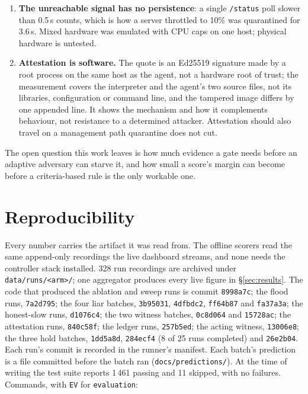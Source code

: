 \documentclass[10pt,twocolumn,letterpaper]{article}
\begin{document}
\begin{enumerate}[leftmargin=1.2em,itemsep=2pt,topsep=2pt]
  that the gate isolates quickly goes unblamed.
\item \textbf{The unreachable signal has no persistence}: a single
  \texttt{/status} poll slower than 0.5\,s counts, which is how a server
  throttled to 10\% was quarantined for 3.6\,s. Mixed hardware was emulated
  with CPU caps on one host; physical hardware is untested.
\item \textbf{Attestation is software.} The quote is an Ed25519 signature
  made by a root process on the same host as the agent, not a hardware root of
  trust; the measurement covers the interpreter and the agent's two source
  files, not its libraries, configuration or command line, and the tampered
  image differs by one appended line. It shows the mechanism and how it
  complements behaviour, not resistance to a determined attacker. Attestation
  should also travel on a management path quarantine does not cut.
\end{enumerate}

The open question this work leaves is how much evidence a gate needs before an
adaptive adversary can starve it, and how small a score's margin can become
before a criteria-based rule is the only workable one.

\raggedbottom
\section{Reproducibility}
\label{sec:repro}
Every number carries the artifact it was read from. The offline scorers read
the same append-only recordings the live dashboard streams, and none needs the
controller stack installed. 328 run recordings are archived under
\texttt{data/runs/<arm>/}; one aggregator produces every live figure in
\S\ref{sec:results}. The code that produced the ablation and sweep runs is
commit \texttt{8998a7c}; the flood runs, \texttt{7a2d795}; the four liar
batches, \texttt{3b95031}, \texttt{4dfbdc2}, \texttt{ff64b87} and
\texttt{fa37a3a}; the honest-slow runs, \texttt{d1076c4}; the two witness
batches, \texttt{0c8d064} and \texttt{15728ac}; the attestation runs,
\texttt{840c58f}; the ledger runs, \texttt{257b5ed}; the acting witness,
\texttt{13006e8}; the three hold batches, \texttt{1dd5a8d}, \texttt{284ecf4}
(8 of 25 runs completed) and \texttt{26e2b04}. Each run's commit is recorded
in the runner's manifest. Each batch's
prediction is a file committed before the batch ran
(\texttt{docs/predictions/}). At the time of writing the test suite reports
1\,461 passing and 11 skipped, with no failures.
Commands, with \texttt{EV} for \texttt{evaluation}:
\end{document}
